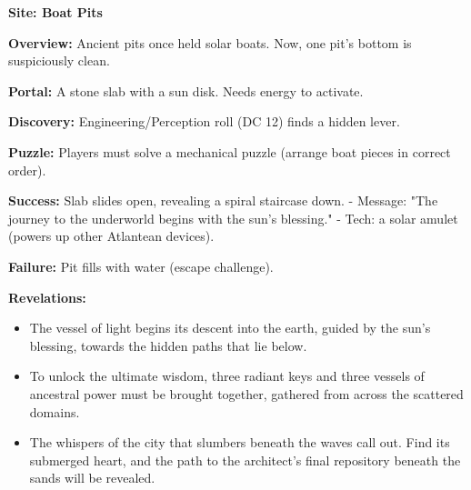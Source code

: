 \documentclass[12pt]{article}
\begin{document}
\textbf{Site: Boat Pits}

\textbf{Overview:}  
Ancient pits once held solar boats. Now, one pit's bottom is suspiciously clean.

\textbf{Portal:}  
A stone slab with a sun disk. Needs energy to activate.

\textbf{Discovery:}  
Engineering/Perception roll (DC 12) finds a hidden lever.

\textbf{Puzzle:}  
Players must solve a mechanical puzzle (arrange boat pieces in correct order).

\textbf{Success:}  
Slab slides open, revealing a spiral staircase down.  
- Message: "The journey to the underworld begins with the sun's blessing."  
- Tech: a solar amulet (powers up other Atlantean devices).

\textbf{Failure:}  
Pit fills with water (escape challenge).

\textbf{Revelations:}
\begin{itemize}
  \item The vessel of light begins its descent into the earth, guided by the sun's blessing, towards the hidden paths that lie below.
  \item To unlock the ultimate wisdom, three radiant keys and three vessels of ancestral power must be brought together, gathered from across the scattered domains.
  \item The whispers of the city that slumbers beneath the waves call out. Find its submerged heart, and the path to the architect's final repository beneath the sands will be revealed.
\end{itemize}
\end{document}

